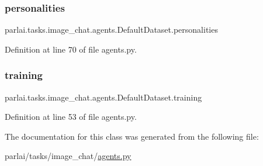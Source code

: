 \subsubsection{\texorpdfstring{personalities}{personalities}}
{\footnotesize\ttfamily parlai.\+tasks.\+image\+\_\+chat.\+agents.\+Default\+Dataset.\+personalities}



Definition at line 70 of file agents.\+py.

\mbox{\label{classparlai_1_1tasks_1_1image__chat_1_1agents_1_1DefaultDataset_a2419786bfafc52743cd7a551a5bad7d1}} 
\subsubsection{\texorpdfstring{training}{training}}
{\footnotesize\ttfamily parlai.\+tasks.\+image\+\_\+chat.\+agents.\+Default\+Dataset.\+training}



Definition at line 53 of file agents.\+py.



The documentation for this class was generated from the following file\+:\begin{DoxyCompactItemize}
\item 
parlai/tasks/image\+\_\+chat/\hyperlink{parlai_2tasks_2image__chat_2agents_8py}{agents.\+py}\end{DoxyCompactItemize}
